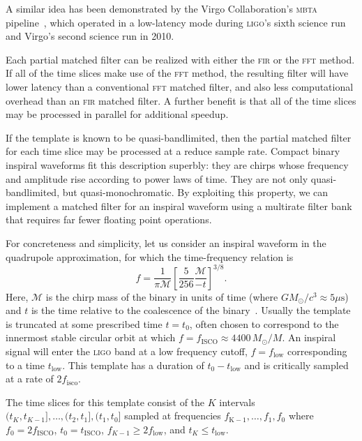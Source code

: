   A similar idea
has been demonstrated by the Virgo Collaboration's \textsc{mbta}
pipeline~\cite{Marion2004,beauville2006,beauville2008,Buskulic2010}, which
operated in a low-latency mode during \textsc{ligo}'s sixth science run and
Virgo's second science run in 2010.

Each partial matched filter can be realized with either the \textsc{fir} or the
\textsc{fft} method.  If all of the time slices make use of the \textsc{fft}
method, the resulting filter will have lower latency than a conventional
\textsc{fft} matched filter, and also less computational overhead than an
\textsc{fir} matched filter.  A further benefit is that all of the time slices
may be processed in parallel for additional speedup.

If the template is known to be quasi-bandlimited, then the partial matched
filter for each time slice may be processed at a reduce sample rate.  Compact
binary inspiral waveforms fit this description superbly: they are chirps whose
frequency and amplitude rise according to power laws of time.  They are not
only quasi-bandlimited, but quasi-monochromatic.  By exploiting this property,
we can implement a matched filter for an inspiral waveform using a multirate
filter bank that requires far fewer floating point operations.

For concreteness and simplicity, let us consider an inspiral waveform in the
quadrupole approximation, for which the time-frequency relation is
%
\begin{equation} \label{eq:fgw}
%
f = \frac{1}{\mathcal{\pi M}} \left[ \frac{5}{256}\frac{\mathcal{M}}{-t}
\right]^{3/8}.
%
\end{equation}
%
Here, $\mathcal{M}$ is the chirp mass of the binary in units of time (where $G
M_\odot / c^3 \approx 5 \mu\mathrm{s}$) and $t$ is the time relative to the
coalescence of the binary~\cite{findchirppaper, kidder1992, blanchet2002,
hanna2009}.  Usually the template is
truncated at some prescribed time $t = t_0$, often chosen to correspond to the
innermost stable circular orbit at which $f = f_\mathrm{ISCO} \approx 4400 \,
M_\odot / M$.  An inspiral signal will enter the \textsc{ligo} band at a low
frequency cutoff, $f = f_\mathrm{low}$ corresponding to a time
$t_\mathrm{low}$.  This template has a duration of $t_\mathrm{0} -
t_\mathrm{low}$ and is critically sampled at a rate of $2 f_\mathrm{isco}$.

The time slices for this template consist of the $K$ intervals $(t_K, t_{K-1}],
\dots, (t_2, t_1], (t_1, t_0]$ sampled at frequencies $f_\mathrm{K-1}, \dots,
f_1, f_0$ where $f_0 = 2 f_\mathrm{ISCO}$, $t_0 = t_\mathrm{ISCO}$, $f_{K-1}
\geqslant 2 f_\mathrm{low}$, and $t_K \leqslant t_\mathrm{low}$.

